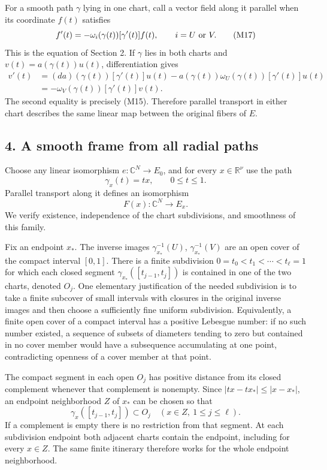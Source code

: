 \documentclass[
  11pt,
]{article}
\begin{document}
For a smooth path \(\gamma\) lying in one chart, call a vector field
along it parallel when its coordinate \(f(t)\) satisfies \[
f'(t)=-\omega_i(\gamma(t))[\gamma'(t)]f(t),
\qquad i=U\hbox{ or }V.
\tag{M17}
\] This is the equation of Section 2. If \(\gamma\) lies in both charts
and \(v(t)=a(\gamma(t))u(t)\), differentiation gives \[
\begin{aligned}
v'(t)
&=(da)(\gamma(t))[\gamma'(t)]u(t)
 -a(\gamma(t))\omega_U(\gamma(t))[\gamma'(t)]u(t)\\
&=-\omega_V(\gamma(t))[\gamma'(t)]v(t).
\end{aligned}
\tag{M18}
\] The second equality is precisely (M15). Therefore parallel transport
in either chart describes the same linear map between the original
fibers of \(E\).

\subsection{4. A smooth frame from all radial
paths}\label{a-smooth-frame-from-all-radial-paths}

Choose any linear isomorphism \(e:\mathbb C^N\to E_0\), and for every
\(x\in\mathbb R^\nu\) use the path \[
\gamma_x(t)=tx,\qquad0\leq t\leq1.
\tag{M19}
\] Parallel transport along it defines an isomorphism \[
F(x):\mathbb C^N\longrightarrow E_x.
\tag{M20}
\] We verify existence, independence of the chart subdivisions, and
smoothness of this family.

Fix an endpoint \(x_*\). The inverse images \(\gamma_{x_*}^{-1}(U)\),
\(\gamma_{x_*}^{-1}(V)\) are an open cover of the compact interval
\([0,1]\). There is a finite subdivision \(0=t_0<t_1<\cdots<t_\ell=1\)
for which each closed segment \(\gamma_{x_*}([t_{j-1},t_j])\) is
contained in one of the two charts, denoted \(O_j\). One elementary
justification of the needed subdivision is to take a finite subcover of
small intervals with closures in the original inverse images and then
choose a sufficiently fine uniform subdivision. Equivalently, a finite
open cover of a compact interval has a positive Lebesgue number: if no
such number existed, a sequence of subsets of diameters tending to zero
but contained in no cover member would have a subsequence accumulating
at one point, contradicting openness of a cover member at that point.

The compact segment in each open \(O_j\) has positive distance from its
closed complement whenever that complement is nonempty. Since
\(|tx-tx_*|\leq|x-x_*|\), an endpoint neighborhood \(Z\) of \(x_*\) can
be chosen so that \[
\gamma_x([t_{j-1},t_j])\subset O_j
\quad(x\in Z,\ 1\leq j\leq\ell).
\tag{M21}
\] If a complement is empty there is no restriction from that segment.
At each subdivision endpoint both adjacent charts contain the endpoint,
including for every \(x\in Z\). The same finite itinerary therefore
works for the whole endpoint neighborhood.
\end{document}
